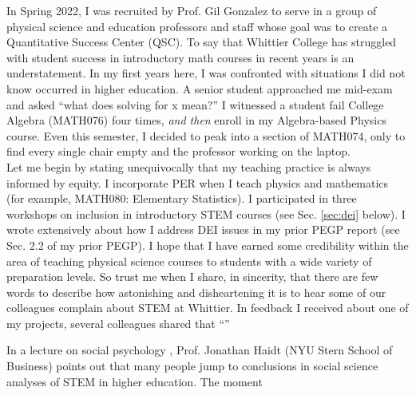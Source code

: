 \documentclass[../../../main.tex]{subfiles}
\begin{document}
\label{sec:qsc}

In Spring 2022, I was recruited by Prof. Gil Gonzalez to serve in a group of physical science and education professors and staff whose goal was to create a Quantitative Success Center (QSC).  To say that Whittier College has struggled with student success in introductory math courses in recent years is an understatement.  In my first years here, I was confronted with situations I did not know occurred in higher education.  A senior student approached me mid-exam and asked ``what does solving for x mean?'' I witnessed a student fail College Algebra (MATH076) four times, \textit{and then} enroll in my Algebra-based Physics course.  Even this semester, I decided to peak into a section of MATH074, only to find every single chair empty and the professor working on the laptop.
\\
\vspace{0.25cm}
Let me begin by stating unequivocally that my teaching practice is always informed by equity.  I incorporate PER when I teach physics and mathematics (for example, MATH080: Elementary Statistics).  I participated in three workshops on inclusion in introductory STEM courses (see Sec. \ref{sec:dei} below).  I wrote extensively about how I address DEI issues in my prior PEGP report (see Sec. 2.2 of my prior PEGP).  I hope that I have earned some credibility within the area of teaching physical science courses to students with a wide variety of preparation levels.  So trust me when I share, in sincerity, that there are few words to describe how astonishing and disheartening it is to hear some of our colleagues complain about STEM at Whittier.  In feedback I received about one of my projects, several colleagues shared that ``''

In a lecture on social psychology \cite{haidt}, Prof. Jonathan Haidt (NYU Stern School of Business) points out that many people jump to conclusions in social science analyses of STEM in higher education.  The moment 
\end{document}
